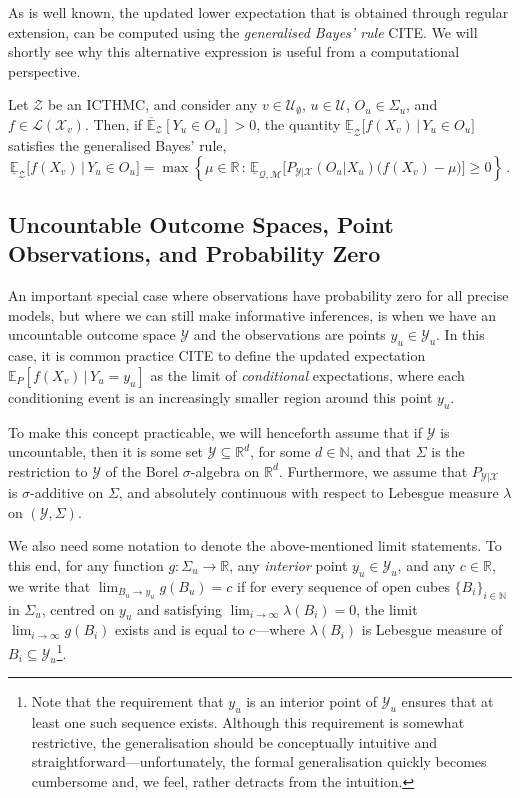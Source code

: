 \documentclass[twoside,11pt]{article}
\newcommand{\nats}{\mathbb{N}}
\newcommand{\reals}{\mathbb{R}}
\newcommand{\states}{\mathcal{X}}
\newcommand{\observs}{\mathcal{Y}}
\newcommand{\lexp}{\underline{\mathbb{E}}_{\rateset,\mathcal{M}}}
\newcommand{\gambles}{\mathcal{L}}
\newcommand{\rateset}{\mathcal{Q}}
\begin{document}
As is well known, the updated lower expectation that is obtained through regular extension, can be computed using the \emph{generalised Bayes' rule} CITE. We will shortly see why this alternative expression is useful from a computational perspective.
\begin{proposition}\label{prop:GBR_regular}
Let $\mathcal{Z}$ be an ICTHMC, and consider any $v\in\mathcal{U}_\emptyset$, $u\in\mathcal{U}$, $O_u\in\Sigma_u$, and $f\in\gambles(\states_v)$. Then, if $\overline{\mathbb{E}}_\mathcal{Z}[Y_u\in O_u] > 0$, the quantity $\underline{\mathbb{E}}_{\mathcal{Z}}\bigl[f(X_v)\,\vert\,Y_u\in O_u\bigr]$ satisfies the generalised Bayes' rule,
\begin{equation*}
\underline{\mathbb{E}}_{\mathcal{Z}}\bigl[f(X_v)\,\vert\,Y_u\in O_u\bigr] = \max\left\{\mu\in\reals\,:\, \lexp\bigl[P_{\observs\vert\states}(O_u\vert X_u)\bigl(f(X_v) - \mu\bigr)\bigr] \geq 0\right\}\,.
\end{equation*}
\end{proposition}

\subsection{Uncountable Outcome Spaces, Point Observations, and Probability Zero}\label{subsec:uncountable}

An important special case where observations have probability zero for all precise models, but where we can still make informative inferences, is when we have an uncountable outcome space $\observs$ and the observations are points $y_u\in\observs_u$. In this case, it is common practice CITE to define the updated expectation $\mathbb{E}_P[f(X_v)\,\vert\,Y_u=y_u]$ as the limit of \emph{conditional} expectations, where each conditioning event is an increasingly smaller region around this point $y_u$.

To make this concept practicable, we will henceforth assume that if $\observs$ is uncountable, then it is some set $\observs\subseteq\reals^d$, for some $d\in\nats$, and that $\Sigma$ is the restriction to $\observs$ of the Borel $\sigma$-algebra on $\reals^d$. Furthermore, we assume that $P_{\observs\vert\states}$ is $\sigma$-additive on $\Sigma$, and absolutely continuous with respect to Lebesgue measure $\lambda$ on $(\observs,\Sigma)$.

We also need some notation to denote the above-mentioned limit statements. To this end, for any function $g:\Sigma_u\to\reals$, any \emph{interior} point $y_u\in\observs_u$, and any $c\in\reals$, we write that $\lim_{B_u\to y_u}g(B_u)=c$ if for every sequence of open cubes $\{B_i\}_{i\in\nats}$ in $\Sigma_u$, centred on $y_u$ and satisfying $\lim_{i\to\infty}\lambda(B_i)=0$, the limit $\lim_{i\to\infty}g(B_i)$ exists and is equal to $c$---where $\lambda(B_i)$ is Lebesgue measure of $B_i\subseteq\observs_u$\footnote{Note that the requirement that $y_u$ is an interior point of $\observs_u$ ensures that at least one such sequence exists. Although this requirement is somewhat restrictive, the generalisation should be conceptually intuitive and straightforward---unfortunately, the formal generalisation quickly becomes cumbersome and, we feel, rather detracts from the intuition.}. 
\end{document}
